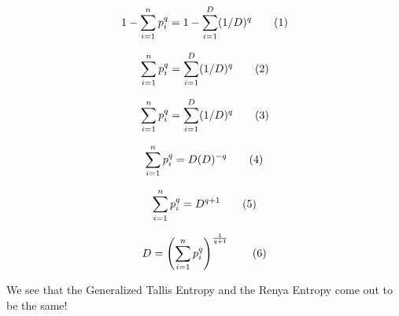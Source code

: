 \[
  1 -
  \sum_{i=1}^{n}
    p_i^q
  =
  1 -
  \sum_{i=1}^{D}
    (1/D)^q
  \addtag
\]

\[
  \sum_{i=1}^{n}
    p_i^q
  =
  \sum_{i=1}^{D}
    (1/D)^q
  \addtag
\]

\[
  \sum_{i=1}^{n}
    p_i^q
  =
  \sum_{i=1}^{D}
    (1/D)^q
  \addtag
\]

\[
  \sum_{i=1}^{n}
    p_i^q
  =
  D
  (D)^{-q}
  \addtag
\]

\[
  \sum_{i=1}^{n}
    p_i^q
  =
  D^{q + 1}
  \addtag
\]

\[
  D =
  \left(
  \sum_{i=1}^{n}
    p_i^q
  \right)^{
    \frac{1}{q + 1}
  }
  \addtag
\]

We see that the Generalized Tallis Entropy and the Renya Entropy come out to be the same!